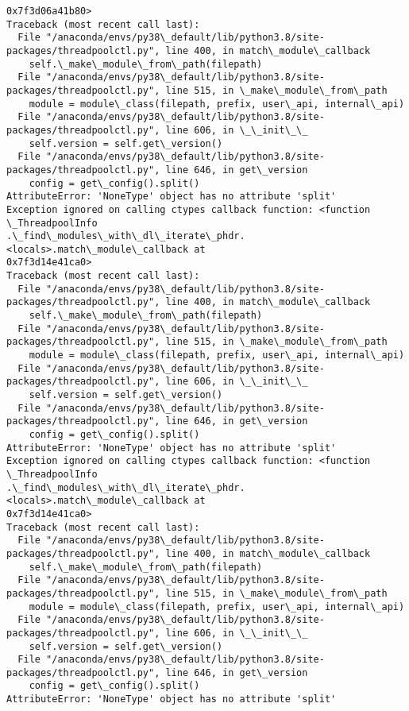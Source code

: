 \documentclass[11pt]{article}
\begin{document}
\begin{Verbatim}[commandchars=\\\{\}]
0x7f3d06a41b80>
Traceback (most recent call last):
  File "/anaconda/envs/py38\_default/lib/python3.8/site-
packages/threadpoolctl.py", line 400, in match\_module\_callback
    self.\_make\_module\_from\_path(filepath)
  File "/anaconda/envs/py38\_default/lib/python3.8/site-
packages/threadpoolctl.py", line 515, in \_make\_module\_from\_path
    module = module\_class(filepath, prefix, user\_api, internal\_api)
  File "/anaconda/envs/py38\_default/lib/python3.8/site-
packages/threadpoolctl.py", line 606, in \_\_init\_\_
    self.version = self.get\_version()
  File "/anaconda/envs/py38\_default/lib/python3.8/site-
packages/threadpoolctl.py", line 646, in get\_version
    config = get\_config().split()
AttributeError: 'NoneType' object has no attribute 'split'
Exception ignored on calling ctypes callback function: <function \_ThreadpoolInfo
.\_find\_modules\_with\_dl\_iterate\_phdr.<locals>.match\_module\_callback at
0x7f3d14e41ca0>
Traceback (most recent call last):
  File "/anaconda/envs/py38\_default/lib/python3.8/site-
packages/threadpoolctl.py", line 400, in match\_module\_callback
    self.\_make\_module\_from\_path(filepath)
  File "/anaconda/envs/py38\_default/lib/python3.8/site-
packages/threadpoolctl.py", line 515, in \_make\_module\_from\_path
    module = module\_class(filepath, prefix, user\_api, internal\_api)
  File "/anaconda/envs/py38\_default/lib/python3.8/site-
packages/threadpoolctl.py", line 606, in \_\_init\_\_
    self.version = self.get\_version()
  File "/anaconda/envs/py38\_default/lib/python3.8/site-
packages/threadpoolctl.py", line 646, in get\_version
    config = get\_config().split()
AttributeError: 'NoneType' object has no attribute 'split'
Exception ignored on calling ctypes callback function: <function \_ThreadpoolInfo
.\_find\_modules\_with\_dl\_iterate\_phdr.<locals>.match\_module\_callback at
0x7f3d14e41ca0>
Traceback (most recent call last):
  File "/anaconda/envs/py38\_default/lib/python3.8/site-
packages/threadpoolctl.py", line 400, in match\_module\_callback
    self.\_make\_module\_from\_path(filepath)
  File "/anaconda/envs/py38\_default/lib/python3.8/site-
packages/threadpoolctl.py", line 515, in \_make\_module\_from\_path
    module = module\_class(filepath, prefix, user\_api, internal\_api)
  File "/anaconda/envs/py38\_default/lib/python3.8/site-
packages/threadpoolctl.py", line 606, in \_\_init\_\_
    self.version = self.get\_version()
  File "/anaconda/envs/py38\_default/lib/python3.8/site-
packages/threadpoolctl.py", line 646, in get\_version
    config = get\_config().split()
AttributeError: 'NoneType' object has no attribute 'split'

\end{Verbatim}
\end{document}
